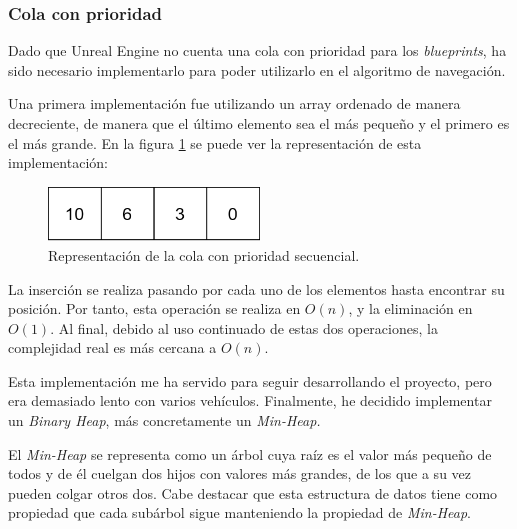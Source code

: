 \subsubsection{Cola con prioridad}
\label{sec:priorityqueue}

Dado que Unreal Engine no cuenta una cola con prioridad para los \textit{blueprints}, ha sido necesario implementarlo para poder utilizarlo en el algoritmo de navegación.

\bigskip

Una primera implementación fue utilizando un array ordenado de manera decreciente, de manera que el último elemento sea el más pequeño y el primero es el más grande. En la figura \ref{fig:seqpq} se puede ver la representación de esta implementación:

\begin{figure}[H]
    \centering
    \includegraphics[width=0.5\textwidth]{imagenes/PQSeq.png}
    \caption{Representación de la cola con prioridad secuencial.}
    \label{fig:seqpq}
\end{figure}

La inserción se realiza pasando por cada uno de los elementos hasta encontrar su posición. Por tanto, esta operación se realiza en $O(n)$, y la eliminación en $O(1)$. Al final, debido al uso continuado de estas dos operaciones, la complejidad real es más cercana a $O(n)$.

\bigskip

Esta implementación me ha servido para seguir desarrollando el proyecto, pero era demasiado lento con varios vehículos. Finalmente, he decidido implementar un \textit{Binary Heap}, más concretamente un \textit{Min-Heap.}

\bigskip

El \textit{Min-Heap} se representa como un árbol cuya raíz es el valor más pequeño de todos y de él cuelgan dos hijos con valores más grandes, de los que a su vez pueden colgar otros dos. Cabe destacar que esta estructura de datos tiene como propiedad que cada subárbol sigue manteniendo la propiedad de \textit{Min-Heap}. 

